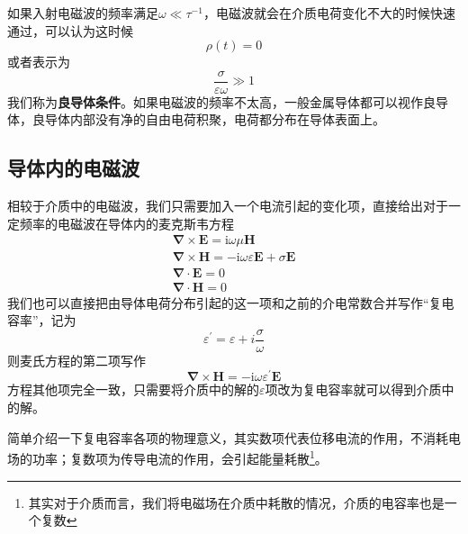         如果入射电磁波的频率满足$\omega \ll \tau^{-1}$，电磁波就会在介质电荷变化不大的时候快速通过，可以认为这时候\[\rho(t)=0\]或者表示为
        \begin{equation}
            \frac{\sigma}{\varepsilon \omega} \gg 1
        \end{equation}
        我们称为\textbf{良导体条件}。如果电磁波的频率不太高，一般金属导体都可以视作良导体，良导体内部没有净的自由电荷积聚，电荷都分布在导体表面上。
    \subsection{导体内的电磁波}
        相较于介质中的电磁波，我们只需要加入一个电流引起的变化项，直接给出对于一定频率的电磁波在导体内的麦克斯韦方程
        \begin{equation}
            \begin{gathered}
            \boldsymbol{\nabla} \times \boldsymbol{E}=\mathrm{i} \omega \mu \boldsymbol{H} \\
            \boldsymbol{\nabla} \times \boldsymbol{H}=-\mathrm{i} \omega \varepsilon\boldsymbol{E}+\sigma \boldsymbol{E} \\
            \boldsymbol{\nabla} \cdot \boldsymbol{E}=0 \\
            \boldsymbol{\nabla} \cdot \boldsymbol{H}=0
            \end{gathered}
        \end{equation}
        我们也可以直接把由导体电荷分布引起的这一项和之前的介电常数合并写作“复电容率”，记为
        \begin{equation}
            \varepsilon^\prime = \varepsilon + i \frac{\sigma}{\omega}
        \end{equation}
        则麦氏方程的第二项写作\[\boldsymbol{\nabla} \times \boldsymbol{H}=-\mathrm{i} \omega \varepsilon^\prime \boldsymbol{E}\]方程其他项完全一致，只需要将介质中的解的$\varepsilon$项改为复电容率就可以得到介质中的解。 

        简单介绍一下复电容率各项的物理意义，其实数项代表位移电流的作用，不消耗电场的功率；复数项为传导电流的作用，会引起能量耗散\footnote{其实对于介质而言，我们将电磁场在介质中耗散的情况，介质的电容率也是一个复数}。

